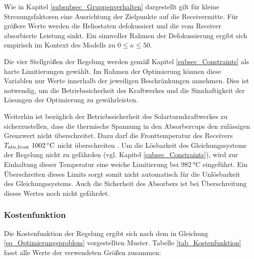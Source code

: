 Wie in Kapitel \ref{subsubsec_Gruppenverhalten} dargestellt gilt für kleine Streuungsfaktoren eine Ausrichtung der Zielpunkte auf die Receivermitte.
Für größere Werte werden die Heliostaten defokussiert und die vom Receiver absorbierte Leistung sinkt.
Ein sinnvoller Rahmen der Defokussierung ergibt sich empirisch im Kontext des Modells zu $0 \leq \kappa \leq 50$.

Die vier Stellgrößen der Regelung werden gemäß Kapitel \ref{subsec_Constraints} als harte Limitierungen gewählt.
Im Rahmen der Optimierung können diese Variablen nur Werte innerhalb der jeweiligen Beschränkungen annehmen.
Dies ist notwendig, um die Betriebssicherheit des Kraftwerkes und die Sinnhaftigkeit der Lösungen der Optimierung zu gewährleisten.

Weiterhin ist bezüglich der Betriebssicherheit des Solarturmkraftwerkes zu sicherzustellen, dass die thermische Spannung in den Absorbercups den zulässigen Grenzwert nicht überschreitet.
Dazu darf die Fronttemperatur des Receivers $T_{\mathrm{abs,front}}~\SI{1002}{\celsius}$ nicht überschreiten \cite[S.29]{HandbuchJülich}.
Um die Lösbarkeit des Gleichungssystems der Regelung nicht zu gefährden (vgl. Kapitel \ref{subsec_Constraints}), wird zur Einhaltung dieser Temperatur eine weiche Limitierung bei $\SI{982}{\celsius}$ eingeführt.
Ein Überschreiten dieses Limits sorgt somit nicht automatisch für die Unlösbarkeit des Gleichungssystems.
Auch die Sicherheit des Absorbers ist bei Überschreitung dieses Wertes noch nicht gefährdet.

\subsubsection*{Kostenfunktion} \label{subsubsec_Kostenfunktion}
Die Kostenfunktion der Regelung ergibt sich nach dem in Gleichung \ref{eq_Optimierungsproblem} vorgestellten Muster.
Tabelle \ref{tab_Kostenfunktion} fasst alle Werte der verwendeten Größen zusammen:

